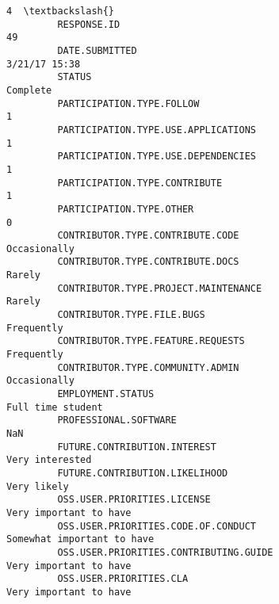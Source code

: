 \documentclass[11pt]{article}
\begin{document}
\begin{Verbatim}[commandchars=\\\{\}]
                                                                                                            4  \textbackslash{}
         RESPONSE.ID                                                                                       49   
         DATE.SUBMITTED                                                                         3/21/17 15:38   
         STATUS                                                                                      Complete   
         PARTICIPATION.TYPE.FOLLOW                                                                          1   
         PARTICIPATION.TYPE.USE.APPLICATIONS                                                                1   
         PARTICIPATION.TYPE.USE.DEPENDENCIES                                                                1   
         PARTICIPATION.TYPE.CONTRIBUTE                                                                      1   
         PARTICIPATION.TYPE.OTHER                                                                           0   
         CONTRIBUTOR.TYPE.CONTRIBUTE.CODE                                                        Occasionally   
         CONTRIBUTOR.TYPE.CONTRIBUTE.DOCS                                                              Rarely   
         CONTRIBUTOR.TYPE.PROJECT.MAINTENANCE                                                          Rarely   
         CONTRIBUTOR.TYPE.FILE.BUGS                                                                Frequently   
         CONTRIBUTOR.TYPE.FEATURE.REQUESTS                                                         Frequently   
         CONTRIBUTOR.TYPE.COMMUNITY.ADMIN                                                        Occasionally   
         EMPLOYMENT.STATUS                                                                  Full time student   
         PROFESSIONAL.SOFTWARE                                                                            NaN   
         FUTURE.CONTRIBUTION.INTEREST                                                         Very interested   
         FUTURE.CONTRIBUTION.LIKELIHOOD                                                           Very likely   
         OSS.USER.PRIORITIES.LICENSE                                                   Very important to have   
         OSS.USER.PRIORITIES.CODE.OF.CONDUCT                                       Somewhat important to have   
         OSS.USER.PRIORITIES.CONTRIBUTING.GUIDE                                        Very important to have   
         OSS.USER.PRIORITIES.CLA                                                       Very important to have   

\end{Verbatim}
\end{document}
